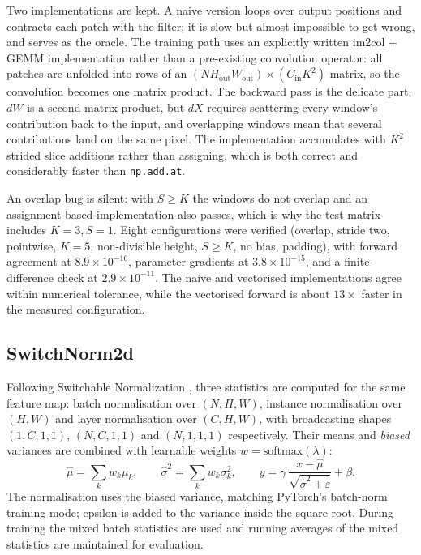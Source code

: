 \documentclass[10pt]{article}
\begin{document}
Two implementations are kept. A naive version loops over output positions and contracts each patch
with the filter; it is slow but almost impossible to get wrong, and serves as the oracle. The
training path uses an explicitly written im2col + GEMM implementation rather than a pre-existing
convolution operator: all patches are unfolded into rows of an
$(N H_{\text{out}}W_{\text{out}})\times(C_{\text{in}}K^2)$ matrix, so the convolution becomes one
matrix product. The backward pass is the delicate part. $dW$ is a second matrix product, but $dX$
requires scattering every window's contribution back to the input, and overlapping windows mean that
several contributions land on the same pixel. The implementation accumulates with $K^2$ strided slice
additions rather than assigning, which is both correct and considerably faster than
\texttt{np.add.at}.

An overlap bug is silent: with $S\ge K$ the windows do not overlap and an assignment-based
implementation also passes, which is why the test matrix includes $K=3,S=1$. Eight configurations
were verified (overlap, stride two, pointwise, $K=5$, non-divisible height, $S\ge K$, no bias,
padding), with forward agreement at $8.9\times10^{-16}$, parameter gradients at
$3.8\times10^{-15}$, and a finite-difference check at $2.9\times10^{-11}$. The naive and
vectorised implementations agree within numerical tolerance, while the vectorised forward is about
$13\times$ faster in the measured configuration.

\subsection{SwitchNorm2d}

Following Switchable Normalization \cite{switchnorm}, three statistics are computed for the same feature map: batch normalisation over $(N,H,W)$,
instance normalisation over $(H,W)$ and layer normalisation over $(C,H,W)$, with broadcasting shapes
$(1,C,1,1)$, $(N,C,1,1)$ and $(N,1,1,1)$ respectively. Their means and \emph{biased} variances are
combined with learnable weights $w=\mathrm{softmax}(\lambda)$:
\begin{equation}
\hat\mu=\sum_k w_k\mu_k,\qquad \hat\sigma^2=\sum_k w_k\sigma_k^2,\qquad
y=\gamma\,\frac{x-\hat\mu}{\sqrt{\hat\sigma^2+\varepsilon}}+\beta .
\end{equation}
The normalisation uses the biased variance, matching PyTorch's batch-norm training mode; epsilon is
added to the variance inside the square root. During training the mixed batch statistics are used and
running averages of the mixed statistics are maintained for evaluation.
\end{document}
